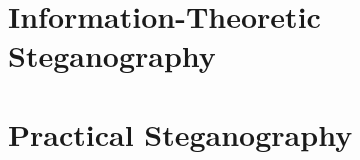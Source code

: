 \documentclass{report}
\begin{document}
	\section{Information-Theoretic Steganography}
	\startsection
	\closesection
	
	\section{Practical Steganography}
	\startsection
	\closesection
\end{document}
